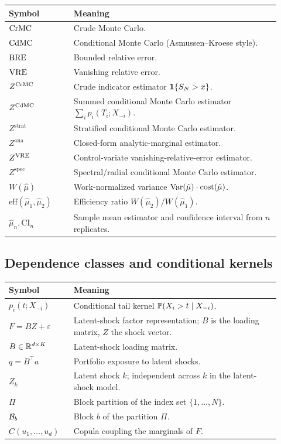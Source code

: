 \begin{longtable}{p{0.22\linewidth}p{0.70\linewidth}}
\toprule
Symbol & Meaning \\
\midrule
\endhead
\(\mathrm{CrMC}\) & Crude Monte Carlo. \\
\(\mathrm{CdMC}\) & Conditional Monte Carlo (Asmussen--Kroese style). \\
\(\mathrm{BRE}\) & Bounded relative error. \\
\(\mathrm{VRE}\) & Vanishing relative error. \\
\(Z^{\mathrm{CrMC}}\) & Crude indicator estimator \(\mathbf{1}\{S_N>x\}\). \\
\(Z^{\mathrm{CdMC}}\) & Summed conditional Monte Carlo estimator \(\sum_i p_i(T_i;X_{-i})\). \\
\(Z^{\mathrm{strat}}\) & Stratified conditional Monte Carlo estimator. \\
\(Z^{\mathrm{ana}}\) & Closed-form analytic-marginal estimator. \\
\(Z^{\mathrm{VRE}}\) & Control-variate vanishing-relative-error estimator. \\
\(Z^{\mathrm{spec}}\) & Spectral/radial conditional Monte Carlo estimator. \\
\(W(\hat\mu)\) & Work-normalized variance \(\operatorname{Var}(\hat\mu)\cdot\mathrm{cost}(\hat\mu)\). \\
\(\mathrm{eff}(\hat\mu_1,\hat\mu_2)\) & Efficiency ratio \(W(\hat\mu_2)/W(\hat\mu_1)\). \\
\(\widehat\mu_n,\mathrm{CI}_n\) & Sample mean estimator and confidence interval from \(n\) replicates. \\
\bottomrule
\end{longtable}

\subsection{Dependence classes and conditional kernels}

\begin{longtable}{p{0.22\linewidth}p{0.70\linewidth}}
\toprule
Symbol & Meaning \\
\midrule
\endhead
\(p_i(t;X_{-i})\) & Conditional tail kernel \(\mathbb{P}(X_i>t\mid X_{-i})\). \\
\(F=BZ+\varepsilon\) & Latent-shock factor representation; \(B\) is the loading matrix, \(Z\) the shock vector. \\
\(B\in\mathbb{R}^{d\times K}\) & Latent-shock loading matrix. \\
\(q=B^\top a\) & Portfolio exposure to latent shocks. \\
\(Z_k\) & Latent shock \(k\); independent across \(k\) in the latent-shock model. \\
\(\Pi\) & Block partition of the index set \(\{1,\ldots,N\}\). \\
\(\mathcal{B}_b\) & Block \(b\) of the partition \(\Pi\). \\
\(C(u_1,\ldots,u_d)\) & Copula coupling the marginals of \(F\). \\
\bottomrule
\end{longtable}


